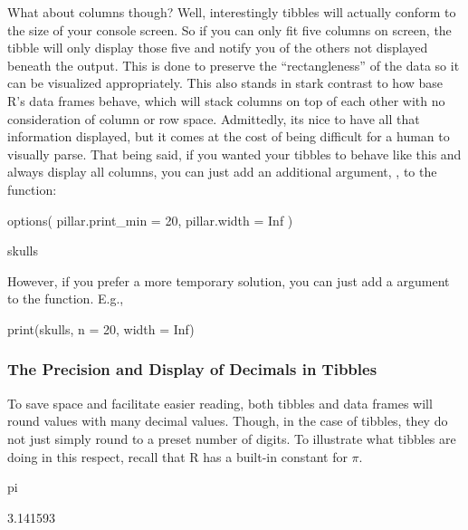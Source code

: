 \vspace{1em}

What about columns though? Well, interestingly tibbles will actually conform to the size of your console screen.  So if you can only fit five columns on screen, the tibble will only display those five and notify you of the others not displayed beneath the output. This is done to preserve the ``rectangleness'' of the data so it can be visualized appropriately. This also stands in stark contrast to how base R's data frames behave, which will stack columns on top of each other with no consideration of column or row space. Admittedly, its nice to have all that information displayed, but it comes at the cost of being difficult for a human to visually parse. That being said, if you wanted your tibbles to behave like this and always display all columns, you can just add an additional argument, , to the  function:

\begin{inR}
options(
  pillar.print_min = 20,
  pillar.width = Inf
)

skulls
\end{inR}

\vspace{1em}

\noindent
However, if you prefer a more temporary solution, you can just add a  argument to the  function. E.g., 

\begin{inR}
print(skulls, n = 20, width = Inf)
\end{inR}

\vspace{1em}

\subsubsection{The Precision and Display of Decimals in Tibbles}
\label{sec:sig_digs}

To save space and facilitate easier reading, both tibbles and data frames will round values with many decimal values. Though, in the case of tibbles, they do not just simply round to a preset number of digits.  To illustrate what tibbles are doing in this respect, recall that R has a built-in constant for $\pi$.

\begin{inR}
pi
\end{inR}
\begin{outR}
[1] 3.141593
\end{outR}

